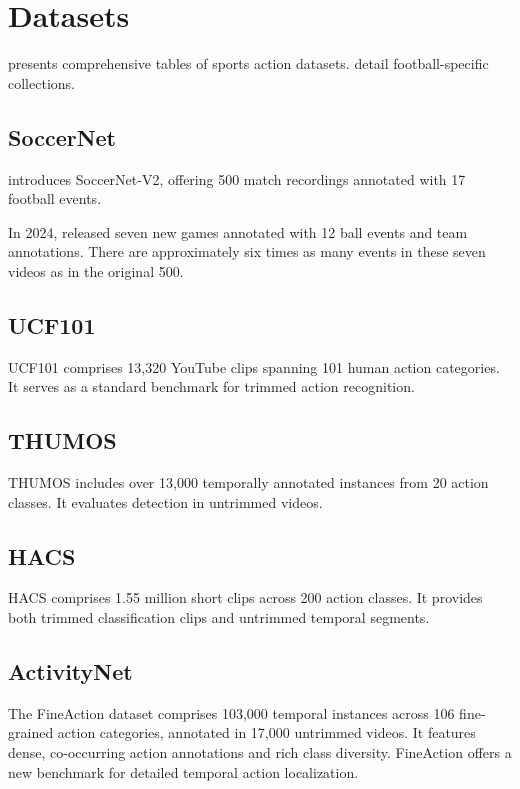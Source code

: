 \section{Datasets}
\label{sec:datasets}

\textcite{survey_of_survey} presents comprehensive tables of sports action datasets. \textcite{seweryn_survey_2023} detail football-specific collections.

\subsection{SoccerNet}

\textcite{deliege_soccernet-v2_dataset_2021} introduces SoccerNet-V2, offering 500 match recordings annotated with 17 football events.

In 2024, \textcite{deliege_soccernet-v2_dataset_2021} released seven new games annotated with 12 ball events and team annotations. There are approximately six times as many events in these seven videos as in the original 500. 

\subsection{UCF101}
UCF101 \cite{dataset:UCF101} comprises 13,320 YouTube clips spanning 101 human action categories. It serves as a standard benchmark for trimmed action recognition.

\subsection{THUMOS}
THUMOS \cite{dataset:thumos} includes over 13,000 temporally annotated instances from 20 action classes. It evaluates detection in untrimmed videos.

\subsection{HACS}
HACS \cite{dataset:hacs} comprises 1.55 million short clips across 200 action classes. It provides both trimmed classification clips and untrimmed temporal segments.

\subsection{ActivityNet}
The FineAction dataset \cite{dataset:fineaction} comprises 103,000 temporal instances across 106 fine-grained action categories, annotated in 17,000 untrimmed videos. It features dense, co-occurring action annotations and rich class diversity. FineAction offers a new benchmark for detailed temporal action localization.


